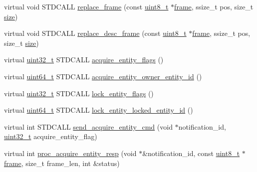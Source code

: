 \begin{DoxyCompactItemize}
\item 
virtual void S\+T\+D\+C\+A\+LL \hyperlink{classavdecc__lib_1_1descriptor__base__imp_a482fe95208e9e14885e28e73e7be2c49}{replace\+\_\+frame} (const \hyperlink{stdint_8h_aba7bc1797add20fe3efdf37ced1182c5}{uint8\+\_\+t} $\ast$\hyperlink{gst__avb__playbin_8c_ac8e710e0b5e994c0545d75d69868c6f0}{frame}, ssize\+\_\+t pos, size\+\_\+t \hyperlink{gst__avb__playbin_8c_a439227feff9d7f55384e8780cfc2eb82}{size})
\item 
virtual void S\+T\+D\+C\+A\+LL \hyperlink{classavdecc__lib_1_1descriptor__base__imp_a8dbf7d4faedf36ec789d33f228e22039}{replace\+\_\+desc\+\_\+frame} (const \hyperlink{stdint_8h_aba7bc1797add20fe3efdf37ced1182c5}{uint8\+\_\+t} $\ast$\hyperlink{gst__avb__playbin_8c_ac8e710e0b5e994c0545d75d69868c6f0}{frame}, ssize\+\_\+t pos, size\+\_\+t \hyperlink{gst__avb__playbin_8c_a439227feff9d7f55384e8780cfc2eb82}{size})
\item 
virtual \hyperlink{parse_8c_a6eb1e68cc391dd753bc8ce896dbb8315}{uint32\+\_\+t} S\+T\+D\+C\+A\+LL \hyperlink{classavdecc__lib_1_1descriptor__base__imp_a2d270d205bcea948cf61311a1f8336c6}{acquire\+\_\+entity\+\_\+flags} ()
\item 
virtual \hyperlink{parse_8c_aec6fcb673ff035718c238c8c9d544c47}{uint64\+\_\+t} S\+T\+D\+C\+A\+LL \hyperlink{classavdecc__lib_1_1descriptor__base__imp_a507b250a984bb5611d2699cd26d60a51}{acquire\+\_\+entity\+\_\+owner\+\_\+entity\+\_\+id} ()
\item 
virtual \hyperlink{parse_8c_a6eb1e68cc391dd753bc8ce896dbb8315}{uint32\+\_\+t} S\+T\+D\+C\+A\+LL \hyperlink{classavdecc__lib_1_1descriptor__base__imp_afe2564a2a32f83deced28efa17f332e2}{lock\+\_\+entity\+\_\+flags} ()
\item 
virtual \hyperlink{parse_8c_aec6fcb673ff035718c238c8c9d544c47}{uint64\+\_\+t} S\+T\+D\+C\+A\+LL \hyperlink{classavdecc__lib_1_1descriptor__base__imp_aeb8f096d55f82522516cbf00a616246a}{lock\+\_\+entity\+\_\+locked\+\_\+entity\+\_\+id} ()
\item 
virtual int S\+T\+D\+C\+A\+LL \hyperlink{classavdecc__lib_1_1descriptor__base__imp_aea9e3053b75477816c15487d3e9a6f70}{send\+\_\+acquire\+\_\+entity\+\_\+cmd} (void $\ast$notification\+\_\+id, \hyperlink{parse_8c_a6eb1e68cc391dd753bc8ce896dbb8315}{uint32\+\_\+t} acquire\+\_\+entity\+\_\+flag)
\item 
virtual int \hyperlink{classavdecc__lib_1_1descriptor__base__imp_a934de13d0b017574d514ce276180a004}{proc\+\_\+acquire\+\_\+entity\+\_\+resp} (void $\ast$\&notification\+\_\+id, const \hyperlink{stdint_8h_aba7bc1797add20fe3efdf37ced1182c5}{uint8\+\_\+t} $\ast$\hyperlink{gst__avb__playbin_8c_ac8e710e0b5e994c0545d75d69868c6f0}{frame}, size\+\_\+t frame\+\_\+len, int \&status)

\end{DoxyCompactItemize}

